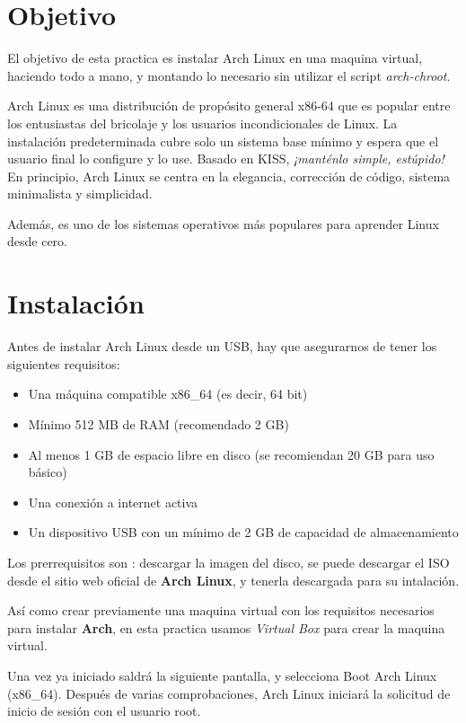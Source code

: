 \documentclass[11pt,letterpaper]{article}
\begin{document}
\section{Objetivo}

El objetivo de esta practica es instalar Arch Linux en una maquina virtual, haciendo todo a mano, y montando lo necesario sin utilizar el script \textit{arch-chroot}.

Arch Linux es una distribución de propósito general x86-64 que es popular entre los entusiastas del bricolaje y los usuarios incondicionales de Linux. La instalación predeterminada cubre solo un sistema base mínimo y espera que el usuario final lo configure y lo use. Basado en KISS, \textit{¡manténlo simple, estúpido!} En principio, Arch Linux se centra en la elegancia, corrección de código, sistema minimalista y simplicidad.

Además, es uno de los sistemas operativos más populares para aprender Linux desde cero. 

\section{Instalación}

Antes de instalar Arch Linux desde un USB, hay que asegurarnos de tener los siguientes requisitos:
\begin{itemize}
    \item Una máquina compatible x86\_64 (es decir, 64 bit)
    \item Mínimo 512 MB de RAM (recomendado 2 GB)
    \item Al menos 1 GB de espacio libre en disco (se recomiendan 20 GB para uso básico)
    \item Una conexión a internet activa
    \item Un dispositivo USB con un mínimo de 2 GB de capacidad de almacenamiento
\end{itemize}

Los prerrequisitos son : descargar la imagen del disco, se puede descargar el ISO desde el sitio web oficial de \textbf{Arch Linux}, y tenerla descargada para su intalación. 

Así como crear previamente una maquina virtual con los requisitos necesarios para instalar \textbf{Arch}, en esta practica usamos \textit{Virtual Box} para crear la maquina virtual.

Una vez ya iniciado saldrá la siguiente pantalla, y selecciona Boot Arch Linux (x86\_64). Después de varias comprobaciones, Arch Linux iniciará la solicitud de inicio de sesión con el usuario root.
\end{document}
